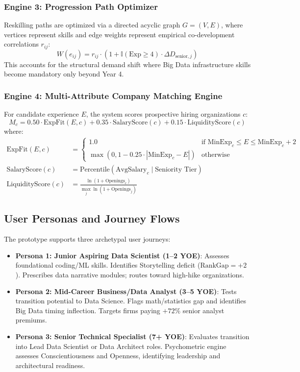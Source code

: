 \documentclass[conference]{IEEEtran}
\begin{document}
\subsubsection{Engine 3: Progression Path Optimizer}
Reskilling paths are optimized via a directed acyclic graph $G=(V, E)$, where vertices represent skills and edge weights represent empirical co-development correlations $r_{ij}$:
\begin{equation}
W(e_{ij}) = r_{ij} \cdot \left(1 + \mathbb{I}(\text{Exp} \ge 4) \cdot \Delta D_{\text{senior}, j}\right)
\label{eq:graph_weight}
\end{equation}
This accounts for the structural demand shift where Big Data infrastructure skills become mandatory only beyond Year 4.

\subsubsection{Engine 4: Multi-Attribute Company Matching Engine}
For candidate experience $E$, the system scores prospective hiring organizations $c$:
\begin{equation}
M_c = 0.50 \cdot \text{ExpFit}(E, c) + 0.35 \cdot \text{SalaryScore}(c) + 0.15 \cdot \text{LiquidityScore}(c)
\label{eq:match_score}
\end{equation}
where:
\begin{align}
\text{ExpFit}(E, c) &= \begin{cases} 
1.0 & \text{if } \text{MinExp}_c \le E \le \text{MinExp}_c + 2 \\ 
\max(0, 1 - 0.25 \cdot |\text{MinExp}_c - E|) & \text{otherwise} 
\end{cases} \\
\text{SalaryScore}(c) &= \text{Percentile}\left(\text{AvgSalary}_c \mid \text{Seniority Tier}\right) \\
\text{LiquidityScore}(c) &= \frac{\ln(1 + \text{Openings}_c)}{\max_j \ln(1 + \text{Openings}_j)}
\end{align}

\subsection{User Personas and Journey Flows}

The prototype supports three archetypal user journeys:
\begin{itemize}
    \item \textbf{Persona 1: Junior Aspiring Data Scientist (1--2 YOE)}: Assesses foundational coding/ML skills. Identifies Storytelling deficit ($\text{RankGap}=+2$). Prescribes data narrative modules; routes toward high-hike organizations.
    \item \textbf{Persona 2: Mid-Career Business/Data Analyst (3--5 YOE)}: Tests transition potential to Data Science. Flags math/statistics gap and identifies Big Data timing inflection. Targets firms paying $+72\%$ senior analyst premiums.
    \item \textbf{Persona 3: Senior Technical Specialist (7+ YOE)}: Evaluates transition into Lead Data Scientist or Data Architect roles. Psychometric engine assesses Conscientiousness and Openness, identifying leadership and architectural readiness.
\end{itemize}
\end{document}

